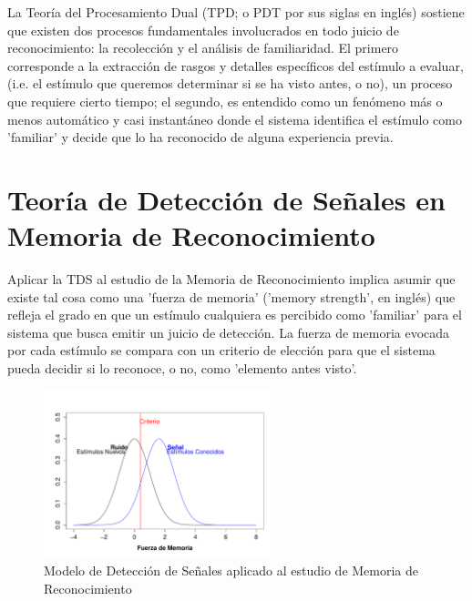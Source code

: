 La Teoría del Procesamiento Dual (TPD; o PDT por sus siglas en inglés) sostiene que existen dos procesos fundamentales involucrados en todo juicio de reconocimiento: la recolección y el análisis de familiaridad. El primero corresponde a la extracción de rasgos y detalles específicos del estímulo a evaluar, (i.e. el estímulo que queremos determinar si se ha visto antes, o no), un proceso que requiere cierto tiempo; el segundo, es entendido como un fenómeno más o menos automático y casi instantáneo donde el sistema identifica el estímulo como 'familiar' y decide que lo ha reconocido de alguna experiencia previa. 


\section{Teoría de Detección de Señales en Memoria de Reconocimiento}
Aplicar la TDS al estudio de la Memoria de Reconocimiento implica asumir que existe tal cosa como una 'fuerza de memoria' ('memory strength', en inglés) que refleja el grado en que un estímulo cualquiera es percibido como 'familiar' para el sistema que busca emitir un juicio de detección. La fuerza de memoria evocada por cada estímulo se compara con un criterio de elección para que el sistema pueda decidir si lo reconoce, o no, como 'elemento antes visto'.\\ 

\begin{figure}[th]
\centering
\includegraphics[width=0.60\textwidth]{Figures/RM_SDT_1} 
\decoRule
\caption[SDT en Memoria de Reconocimiento]{Modelo de Detección de Señales aplicado al estudio de Memoria de Reconocimiento}
\label{fig:RM_SDT_1}
\end{figure}

